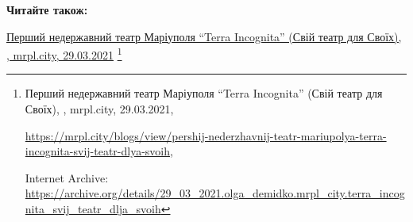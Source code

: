  
 
 
 
 

\def\pubIA{https://archive.org/details/29_03_2021.olga_demidko.mrpl_city.terra_incognita_svij_teatr_dlja_svoih}
\def\pubTitle{Перший недержавний театр Маріуполя \enquote{Terra Incognita} (Свій театр для Своїх)}
\def\pubDate{29.03.2021}
\def\pubOrigin{https://mrpl.city/blogs/view/pershij-nederzhavnij-teatr-mariupolya-terra-incognita-svij-teatr-dlya-svoih}
\def\pubAuthor{\pubAuthorDemidko}

\textbf{Читайте також:}\par\href{\pubIA}{%
\pubTitle, \pubAuthor, mrpl.city, \pubDate}%
\footnote{\pubTitle, \pubAuthor, mrpl.city, \pubDate, \par\url{\pubOrigin}, \par Internet Archive: \url{\pubIA}}
